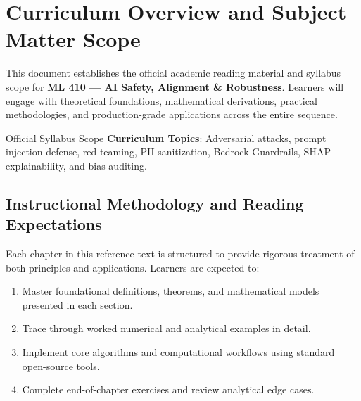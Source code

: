 \section{Curriculum Overview and Subject Matter Scope}

This document establishes the official academic reading material and syllabus scope for \textbf{ML 410 --- AI Safety, Alignment \& Robustness}. Learners will engage with theoretical foundations, mathematical derivations, practical methodologies, and production-grade applications across the entire sequence.

\begin{InsightBox}{Official Syllabus Scope}
  \textbf{Curriculum Topics}: Adversarial attacks, prompt injection defense, red-teaming, PII sanitization, Bedrock Guardrails, SHAP explainability, and bias auditing.
\end{InsightBox}

\subsection{Instructional Methodology and Reading Expectations}

Each chapter in this reference text is structured to provide rigorous treatment of both principles and applications. Learners are expected to:
\begin{enumerate}
  \item Master foundational definitions, theorems, and mathematical models presented in each section.
  \item Trace through worked numerical and analytical examples in detail.
  \item Implement core algorithms and computational workflows using standard open-source tools.
  \item Complete end-of-chapter exercises and review analytical edge cases.
\end{enumerate}


